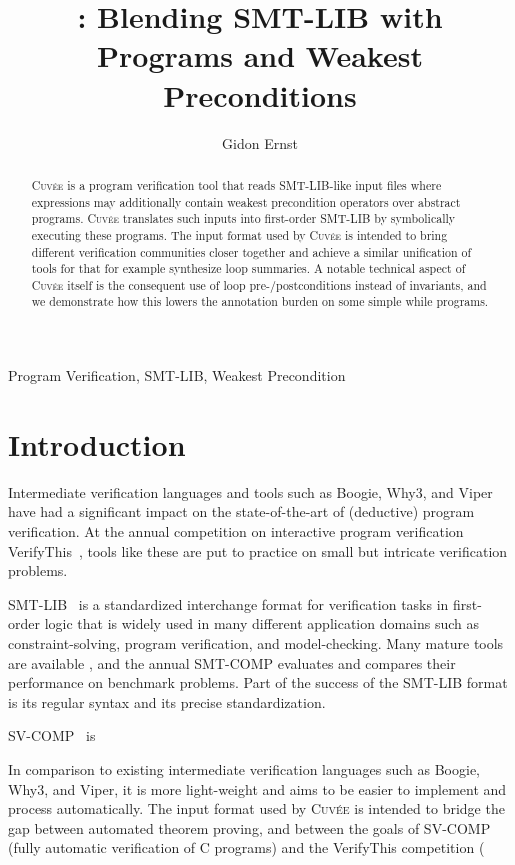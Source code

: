 \documentclass[fleqn]{llncs}
\title{\Cuvee: Blending SMT-LIB with \\ Programs and Weakest Preconditions}
\author{Gidon Ernst}
\institute{LMU Munich, Germany, \email{gidon.ernst@lmu.de}}
\newcommand{\Cuvee}{\textsc{Cuvée}\xspace}
\begin{document}
\maketitle

\begin{abstract}
\Cuvee is a program verification tool that reads SMT-LIB-like input files where expressions may additionally contain weakest precondition operators over abstract programs.
\Cuvee translates such inputs into first-order SMT-LIB by symbolically executing these programs.
The input format used by \Cuvee is intended to bring different verification communities closer together and achieve a similar unification of tools for that for example synthesize loop summaries.
A notable technical aspect of \Cuvee itself is the consequent use of loop pre-/postconditions instead of invariants, and we demonstrate how this lowers the annotation burden on some simple while programs.
\end{abstract}

\begin{keywords}
Program Verification, SMT-LIB, Weakest Precondition
\end{keywords}

\section{Introduction}

Intermediate verification languages and tools such as Boogie, Why3, and Viper
have had a significant impact on the state-of-the-art of (deductive) program verification.
At the annual competition on interactive program verification VerifyThis~\cite{},
tools like these are put to practice on small but intricate verification problems.

SMT-LIB~\cite{} is a standardized interchange format for verification tasks in first-order logic
that is widely used in many different application domains such as constraint-solving, program verification, and model-checking.
Many mature tools are available \cite{}, and the annual SMT-COMP evaluates and compares their performance on benchmark problems.
Part of the success of the SMT-LIB format is its regular syntax and its precise standardization.

SV-COMP~\cite{} is 


In comparison to existing intermediate verification languages such as Boogie, Why3, and Viper,
it is more light-weight and aims to be easier to implement and process automatically.
The input format used by \Cuvee is intended to bridge the gap between automated theorem proving,
and between the goals of SV-COMP (fully automatic verification of C programs)
and the VerifyThis competition (
\end{document}
